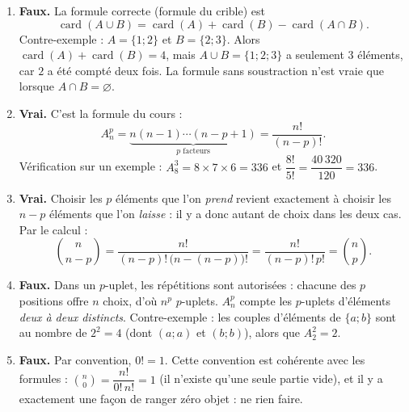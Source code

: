 \documentclass[11pt]{article}
\newcommand{\cle}[1]{{\popxbold\color{popdark}#1}}
\begin{document}
\begin{corrige}
\begin{enumerate}
\item \textbf{Faux.} La formule correcte (formule du crible) est
\[ \operatorname{card}(A\cup B)=\operatorname{card}(A)+\operatorname{card}(B)-\operatorname{card}(A\cap B). \]
Contre-exemple : $A=\{1;2\}$ et $B=\{2;3\}$. Alors $\operatorname{card}(A)+\operatorname{card}(B)=4$, mais $A\cup B=\{1;2;3\}$ a seulement $3$ éléments, car $2$ a été compté deux fois. La formule sans soustraction n'est vraie que lorsque $A\cap B=\varnothing$.
\item \textbf{Vrai.} C'est la formule du cours :
\[ A_n^p=\underbrace{n(n-1)\cdots(n-p+1)}_{p \text{ facteurs}}=\frac{n!}{(n-p)!}. \]
Vérification sur un exemple : $A_8^3=8\times7\times6=336$ et $\dfrac{8!}{5!}=\dfrac{40\,320}{120}=336$.
\item \textbf{Vrai.} Choisir les $p$ éléments que l'on \emph{prend} revient exactement à choisir les $n-p$ éléments que l'on \emph{laisse} : il y a donc autant de choix dans les deux cas. Par le calcul :
\[ \binom{n}{n-p}=\frac{n!}{(n-p)!\,\bigl(n-(n-p)\bigr)!}=\frac{n!}{(n-p)!\,p!}=\binom{n}{p}. \]
\item \textbf{Faux.} Dans un $p$-uplet, les \cle{répétitions sont autorisées} : chacune des $p$ positions offre $n$ choix, d'où $n^p$ $p$-uplets. $A_n^p$ compte les $p$-uplets d'éléments \emph{deux à deux distincts}. Contre-exemple : les couples d'éléments de $\{a;b\}$ sont au nombre de $2^2=4$ (dont $(a;a)$ et $(b;b)$), alors que $A_2^2=2$.
\item \textbf{Faux.} Par convention, $0!=1$. Cette convention est cohérente avec les formules : $\binom{n}{0}=\dfrac{n!}{0!\,n!}=1$ (il n'existe qu'une seule partie vide), et il y a exactement une façon de ranger zéro objet : ne rien faire.
\end{enumerate}
\end{corrige}
\end{document}
